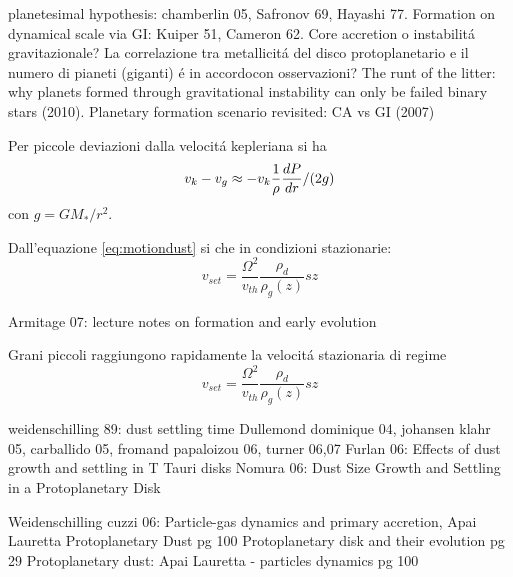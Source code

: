\begin{workout}[Refs GI vs CA]
	planetesimal hypothesis: chamberlin 05, Safronov 69, Hayashi 77. Formation on dynamical scale via GI: Kuiper 51, Cameron 62.
	Core accretion o instabilit\'a gravitazionale?
	La correlazione tra metallicit\'a del disco protoplanetario e il numero di pianeti (giganti) \'e in accordocon osservazioni?
	The runt of the litter: why planets formed through gravitational instability can only be failed binary stars (2010).
	Planetary formation scenario revisited: CA vs GI (2007)
\end{workout}
\begin{workout}
	Per piccole deviazioni dalla velocit\'a kepleriana si ha
	\begin{equation}
	v_k-v_g\approx -v_k\frac{1}{\rho}\TDy{r}{P}/(2g)\label{eq:velocitykg}
	\end{equation}
	con $g=GM_*/r^2$.
\end{workout}
\begin{workout}
	Dall'equazione \eqref{eq:motiondust} si che in condizioni stazionarie:
	\begin{equation}
	v_{set}=\frac{\Omega^2}{v_{th}}\frac{\rho_d}{\rho_g(z)}sz
	\end{equation}
\end{workout}
\begin{workout}
	Armitage 07: lecture notes on formation and early evolution
\end{workout}
\begin{workout}	
	Grani piccoli raggiungono rapidamente la velocit\'a stazionaria di regime
	\begin{equation}
	v_{set}=\frac{\Omega^2}{v_{th}}\frac{\rho_d}{\rho_g(z)}sz
	\end{equation}
\end{workout}
\begin{workout}
	weidenschilling 89: dust settling time
	Dullemond dominique 04, johansen klahr 05, carballido 05, fromand papaloizou 06, turner 06,07
	Furlan 06: Effects of dust growth and settling in T Tauri disks
	Nomura 06: Dust Size Growth and Settling in a Protoplanetary Disk
	\cite{lissauer1993planet}
\end{workout}
\begin{workout}
	Weidenschilling cuzzi 06: Particle-gas dynamics and primary accretion, Apai Lauretta Protoplanetary Dust pg 100
	Protoplanetary disk and their evolution pg 29
	Protoplanetary dust: Apai Lauretta - particles dynamics pg 100
\end{workout}
